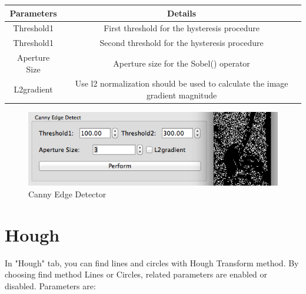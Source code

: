 \documentclass{article}
\begin{document}
\begin{table}[H]
\begin{center}
\begin{tabular}{|c|c|l|l|l|}
\hline
\textbf{Parameters} & \multicolumn{4}{|c|}{\textbf{Details}}                                                              \\ \hline
Threshold1          & \multicolumn{4}{|c|}{First threshold for the hysteresis procedure}                                  \\ \hline
Threshold1          & \multicolumn{4}{|c|}{Second threshold for the hysteresis procedure}                                 \\ \hline
Aperture Size       & \multicolumn{4}{|c|}{Aperture size for the Sobel() operator}                                        \\ \hline
L2gradient          & \multicolumn{4}{|c|}{Use l2 normalization should be used to calculate the image gradient magnitude} \\ \hline
\end{tabular}
\end{center}
\end{table}



\begin{figure}[H]
\begin{center}
\includegraphics[scale=0.5]{toolboxEdge.png}
\caption{Canny Edge Detector}
\end{center}
\end{figure}	

\section{Hough}
In "Hough" tab, you can find lines and circles with Hough Transform method. By choosing find method Lines or Circles, related parameters are enabled or disabled. Parameters are:
\end{document}
